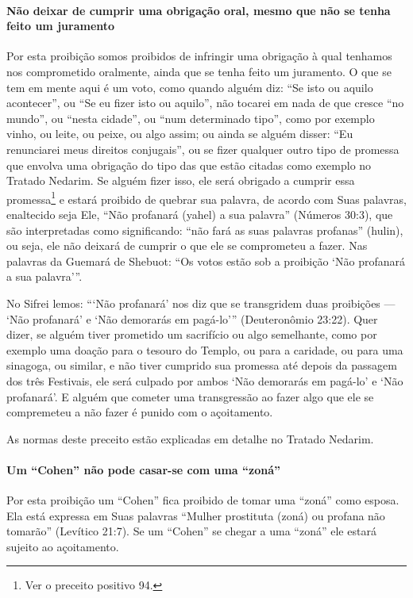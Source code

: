 \paragraph{Não deixar de cumprir uma obrigação oral, mesmo que não se tenha
feito um juramento}

Por esta proibição somos proibidos de infringir uma obrigação à qual
tenhamos nos comprometido oralmente, ainda que se tenha feito um
juramento. O que se tem em mente aqui é um voto, como quando alguém
diz: ``Se isto ou aquilo acontecer'', ou ``Se eu fizer isto ou aquilo'',
não tocarei em nada de que cresce ``no mundo'', ou ``nesta cidade'', ou
``num determinado tipo'', como por exemplo vinho, ou leite, ou peixe, ou algo assim; ou ainda se alguém
disser: ``Eu renunciarei meus direitos conjugais'', ou se fizer
qualquer outro tipo de promessa que envolva uma obrigação do tipo das
que estão citadas como exemplo no Tratado Nedarim. Se alguém fizer isso,
ele será obrigado a cumprir essa promessa\footnote{Ver o preceito positivo 94.} e estará
proibido de quebrar sua palavra, de acordo com Suas palavras, enaltecido
seja Ele, ``Não profanará (yahel) a sua palavra'' (Números 30:3), que
são interpretadas como significando: ``não fará as suas palavras
profanas'' (hulin), ou seja, ele não deixará de cumprir o que ele se
comprometeu a fazer. Nas palavras da Guemará de Shebuot: ``Os votos
estão sob a proibição `Não profanará a sua palavra'''.

No Sifrei lemos: ```Não profanará' nos diz que se transgridem duas
proibições --- `Não profanará' e `Não demorarás em pagá-lo'''
(Deuteronômio 23:22). Quer dizer, se alguém tiver prometido um
sacrifício ou algo semelhante, como por exemplo uma doação para o
tesouro do Templo, ou para a caridade, ou para uma sinagoga, ou similar,
e não tiver cumprido sua promessa até depois da passagem dos três
Festivais, ele será culpado por ambos `Não demorarás em pagá-lo' e `Não
profanará'. E alguém que cometer uma transgressão ao fazer algo que ele
se compremeteu a não fazer é punido com o açoitamento.

As normas deste preceito estão explicadas em detalhe no Tratado Nedarim.

\paragraph{Um ``Cohen'' não pode casar-se com uma ``zoná''}

Por esta proibição um ``Cohen'' fica proibido de tomar uma ``zoná'' como
esposa. Ela está expressa em Suas palavras ``Mulher prostituta (zoná) ou
profana não tomarão'' (Levítico 21:7). Se um ``Cohen'' se chegar a uma
``zoná'' ele estará sujeito ao açoitamento.

